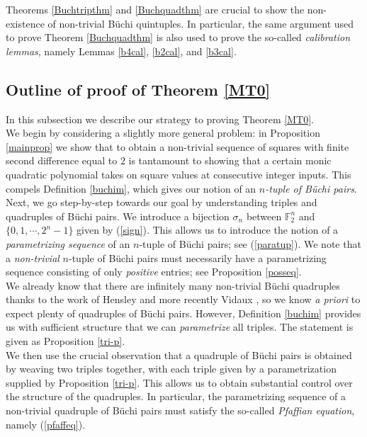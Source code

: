 \documentclass[letterpaper,10pt]{amsart}
\newcommand{\bF}{{\mathbb{F}}}
\theoremstyle{definition}
\numberwithin{equation}{section}
\begin{document}
Theorems \ref{Buchtripthm} and \ref{Buchquadthm} are crucial to show the non-existence of non-trivial B\"{u}chi quintuples. In particular, the same argument used to prove Theorem \ref{Buchquadthm} is also used to prove the so-called \emph{calibration lemmas}, namely Lemmas \ref{b4cal}, \ref{b2cal}, and \ref{b3cal}. 
	
	
	\subsection{Outline of proof of Theorem \ref{MT0}} In this subsection we describe our strategy to proving Theorem \ref{MT0}. \\
	
	We begin by considering a slightly more general problem: in Proposition \ref{mainprop} we show that to obtain a non-trivial sequence of squares with finite second difference equal to $2$ is tantamount to showing that a certain monic quadratic polynomial takes on square values at consecutive integer inputs. This compels Definition \ref{buchim}, which gives our notion of an \emph{$n$-tuple of B\"{u}chi pairs}. \\
	
	Next, we go step-by-step towards our goal by understanding triples and quadruples of B\"{u}chi pairs. We introduce a bijection $\sigma_n$ between $\bF_2^n$ and $\{0, 1, \cdots, 2^n-1\}$ given by (\ref{sign}). This allows us to introduce the notion of a \emph{parametrizing sequence} of an $n$-tuple of B\"{u}chi pairs; see (\ref{paratup}). We note that a \emph{non-trivial} $n$-tuple of B\"{u}chi pairs must necessarily have a parametrizing sequence consisting of only \emph{positive} entries; see Proposition \ref{posseq}.  \\   
		
We already know that there are infinitely many non-trivial B\"{u}chi quadruples thanks to the work of Hensley and more recently Vidaux \cite{Vid}, so we know \emph{a priori} to expect plenty of quadruples of B\"{u}chi pairs. However, Definition \ref{buchim} provides us with sufficient structure that we can \emph{parametrize} all triples. The statement is given as Proposition \ref{tri-p}. \\
	
	We then use the crucial observation that a quadruple of B\"{u}chi pairs is obtained by weaving two triples together, with each triple given by a parametrization supplied by Proposition \ref{tri-p}. This allows us to obtain substantial control over the structure of the quadruples. In particular, the parametrizing sequence of a non-trivial quadruple of B\"{u}chi pairs must satisfy the so-called \emph{Pfaffian equation}, namely (\ref{pfaffeq}).   \\
	
\end{document}
